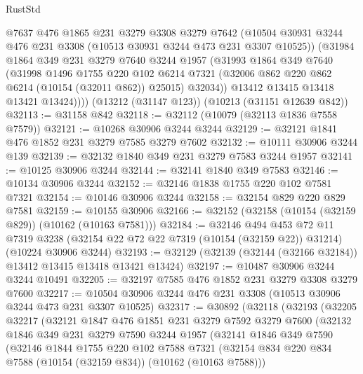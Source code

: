 \begin{lexlean}{RustStd}
\begin{coremodule}
          @7637
          @476
          @1865
          @231
          @3279
          @3308
          @3279
          @7642
          (@10504 @30931 @3244 @476 @231 @3308 (@10513 @30931 @3244 @473 @231 @3307 @10525))
          (@31984
            @1864
            @349
            @231
            @3279
            @7640
            @3244
            @1957
            (@31993
              @1864
              @349
              @7640
              (@31998
                @1496
                @1755
                @220
                @102
                @6214
                @7321
                (@32006 @862 @220 @862 @6214 (@10154 (@32011 @862)) @25015)
                @32034))
            @13412
            @13415
            @13418
            @13421
            @13424))))
    (@13212 (@31147 @123))
    (@10213 (@31151 @12639 @842))
@32113 := @31158 @842
@32118 := @32112 (@10079 (@32113 @1836 @7558 @7579))
@32121 := @10268 @30906 @3244 @3244
@32129 := @32121 @1841 @476 @1852 @231 @3279 @7585 @3279 @7602
@32132 := @10111 @30906 @3244 @139
@32139 := @32132 @1840 @349 @231 @3279 @7583 @3244 @1957
@32141 := @10125 @30906 @3244
@32144 := @32141 @1840 @349 @7583
@32146 := @10134 @30906 @3244
@32152 := @32146 @1838 @1755 @220 @102 @7581 @7321
@32154 := @10146 @30906 @3244
@32158 := @32154 @829 @220 @829 @7581
@32159 := @10155 @30906
@32166 := @32152 (@32158 (@10154 (@32159 @829)) (@10162 (@10163 @7581)))
@32184 := @32146
    @494
    @453
    @72
    @11
    @7319
    @3238
    (@32154 @22 @72 @22 @7319 (@10154 (@32159 @22)) @31214)
    (@10224 @30906 @3244)
@32193 := @32129 (@32139 (@32144 (@32166 @32184)) @13412 @13415 @13418 @13421 @13424)
@32197 := @10487 @30906 @3244 @3244 @10491
@32205 := @32197 @7585 @476 @1852 @231 @3279 @3308 @3279 @7600
@32217 := @10504 @30906 @3244 @476 @231 @3308 (@10513 @30906 @3244 @473 @231 @3307 @10525)
@32317 := @30892
    (@32118
      (@32193
        (@32205
          @32217
          (@32121
            @1847
            @476
            @1851
            @231
            @3279
            @7592
            @3279
            @7600
            (@32132
              @1846
              @349
              @231
              @3279
              @7590
              @3244
              @1957
              (@32141
                @1846
                @349
                @7590
                (@32146
                  @1844
                  @1755
                  @220
                  @102
                  @7588
                  @7321
                  (@32154 @834 @220 @834 @7588 (@10154 (@32159 @834)) (@10162 (@10163 @7588)))

\end{coremodule}
\end{lexlean}
